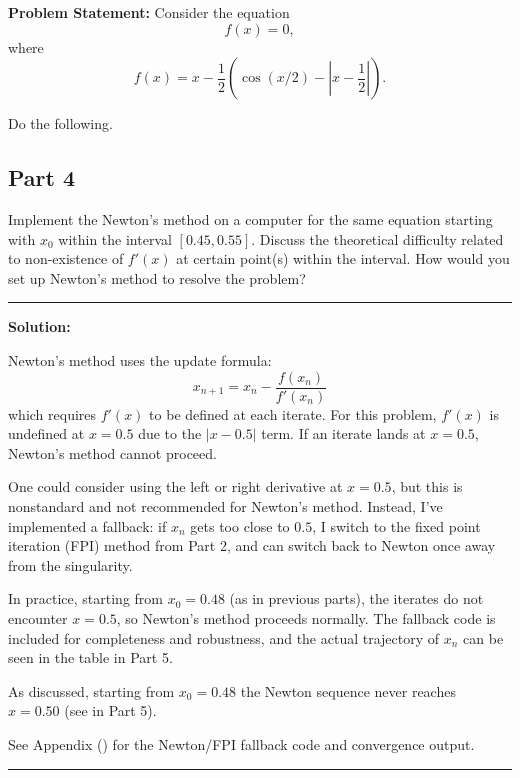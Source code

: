 \clearpage
{}

\textbf{Problem Statement:} Consider the equation
$$f(x) = 0,$$
where
$$f(x) = x - \frac{1}{2}\left(\cos(x/2) - \left|x - \frac{1}{2}\right|\right).$$

Do the following.

\subsection*{Part 4}

Implement the Newton’s method on a computer for the same equation starting with $x_0$ within the interval $[0.45, 0.55]$. Discuss the theoretical difficulty related to non-existence of $f'(x)$ at certain point(s) within the interval. How would you set up Newton’s method to resolve the problem?

\noindent\rule{\textwidth}{0.4pt}

\vspace{1em}

\textbf{Solution:}

Newton's method uses the update formula:
\[
    x_{n+1} = x_n - \frac{f(x_n)}{f'(x_n)}
\]
which requires $f'(x)$ to be defined at each iterate. For this problem, $f'(x)$ is undefined at $x = 0.5$ due to the $|x-0.5|$ term. If an iterate lands at $x = 0.5$, Newton's method cannot proceed.

One could consider using the left or right derivative at $x=0.5$, but this is nonstandard and not recommended for Newton's method. Instead, I've implemented a fallback: if $x_n$ gets too close to $0.5$, I switch to the fixed point iteration (FPI) method from Part 2, and can switch back to Newton once away from the singularity.

In practice, starting from $x_0 = 0.48$ (as in previous parts), the iterates do not encounter $x=0.5$, so Newton's method proceeds normally. The fallback code is included for completeness and robustness, and the actual trajectory of $x_n$ can be seen in the table in Part 5.

As discussed, starting from $x_0=0.48$ the Newton sequence never reaches $x=0.50$ (see  in Part 5).

See Appendix () for the Newton/FPI fallback code and convergence output.

\vspace{2em}
\noindent\rule{\textwidth}{0.4pt}



